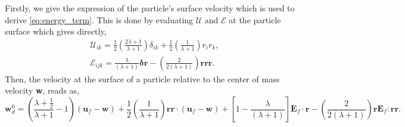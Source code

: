 Firstly, we give the expression of the particle's surface velocity which is used to derive \ref{eq:energy_term}. 
This is done by evaluating $\mathcal{U}$ and $\mathcal{E}$ at the particle surface which gives directly, 
\begin{align}
    \mathcal{U}_{ik} = 
    \frac{1}{2}\left(\frac{2\lambda + 1}{\lambda +1}\right)
    \delta_{ik} 
    + 
    \frac{1}{2}\left(\frac{1}{\lambda +1}\right)
    r_ir_k,  \\
    \mathcal{E}_{ijk}
    = 
    \frac{\lambda}{(\lambda + 1)}
    \bm\delta\textbf{r}
    -\left(\frac{2}{2(\lambda +1 )} \right) \textbf{rrr}. 
\end{align}
Then, the velocity at the surface of a particle relative to the center of mass velocity \textbf{w}, reads as, 
\begin{equation*}
    \textbf{w}_d^0 
    = \left(\frac{\lambda + \frac{1}{2}}{\lambda +1} - 1\right)
    (\textbf{u}_f - \textbf{w}) 
    + 
    \frac{1}{2}\left(\frac{1}{\lambda +1}\right)
    \textbf{rr} \cdot (\textbf{u}_f - \textbf{w})  
    + \left[1-\frac{\lambda}{(\lambda + 1)}\right]\textbf{E}_f\cdot\textbf{r}
    -\left(\frac{2}{2(\lambda +1 )} \right) \textbf{r} \textbf{E}_f:\textbf{rr}. 
\end{equation*}

